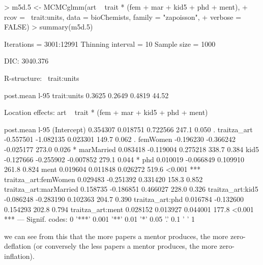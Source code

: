 \documentclass{article}
\begin{document}
\begin{Schunk}
\begin{Sinput}
> m5d.5 <- MCMCglmm(art ~ trait * (fem + mar + kid5 + phd + ment), 
+     rcov = ~trait:units, data = bioChemists, family = "zapoisson", 
+     verbose = FALSE)
> summary(m5d.5)
\end{Sinput}
\begin{Soutput}
 Iterations = 3001:12991
 Thinning interval  = 10
 Sample size  = 1000 

 DIC: 3040.376 

 R-structure:  ~trait:units

            post.mean l-95%
trait:units    0.3625   0.2649   0.4819    44.52

 Location effects: art ~ trait * (fem + mar + kid5 + phd + ment) 

                       post.mean  l-95%
(Intercept)             0.354307  0.018751  0.722566    247.1  0.050 .  
traitza_art            -0.557501 -1.082135  0.023301    149.7  0.062 .  
femWomen               -0.196230 -0.366242 -0.025177    273.0  0.026 *  
marMarried              0.083418 -0.119004  0.275218    338.7  0.384    
kid5                   -0.127666 -0.255902 -0.007852    279.1  0.044 *  
phd                     0.010019 -0.066849  0.109910    261.8  0.824    
ment                    0.019604  0.011848  0.026272    519.6 <0.001 ***
traitza_art:femWomen    0.029483 -0.251392  0.331420    158.3  0.852    
traitza_art:marMarried  0.158735 -0.186851  0.466027    228.0  0.326    
traitza_art:kid5       -0.086248 -0.283190  0.102363    204.7  0.390    
traitza_art:phd         0.016784 -0.132600  0.154293    202.8  0.794    
traitza_art:ment        0.028152  0.013927  0.044001    177.8 <0.001 ***
---
Signif. codes:  0 '***' 0.001 '**' 0.01 '*' 0.05 '.' 0.1 ' ' 1 
\end{Soutput}
\end{Schunk}

we can see from this that the more papers a mentor produces, the more zero-deflation (or conversely the less papers a mentor produces, the more zero-inflation).

\ifalone
\end{document}

